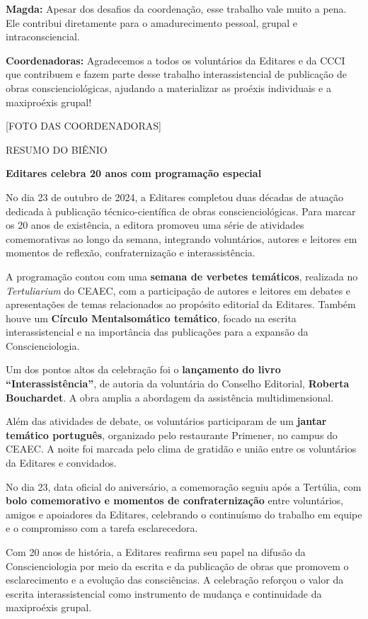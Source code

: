 \textbf{Magda:} Apesar dos desafios da coordenação, esse trabalho vale muito a pena. Ele contribui diretamente para o amadurecimento pessoal, grupal e intraconsciencial.

\textbf{Coordenadoras:} Agradecemos a todos os voluntários da Editares e da CCCI que contribuem e fazem parte desse trabalho interassistencial de publicação de obras conscienciológicas, ajudando a materializar as proéxis individuais e a maxiproéxis grupal!

{[}FOTO DAS COORDENADORAS{]}

RESUMO DO BIÊNIO

\textbf{Editares celebra 20 anos com programação especial}

No dia 23 de outubro de 2024, a Editares completou duas décadas de atuação dedicada à publicação técnico-científica de obras conscienciológicas. Para marcar os 20 anos de existência, a editora promoveu uma série de atividades comemorativas ao longo da semana, integrando voluntários, autores e leitores em momentos de reflexão, confraternização e interassistência.

A programação contou com uma \textbf{semana de verbetes temáticos}, realizada no \emph{Tertuliarium} do CEAEC, com a participação de autores e leitores em debates e apresentações de temas relacionados ao propósito editorial da Editares. Também houve um \textbf{Círculo Mentalsomático temático}, focado na escrita interassistencial e na importância das publicações para a expansão da Conscienciologia.

Um dos pontos altos da celebração foi o \textbf{lançamento do livro ``Interassistência''}, de autoria da voluntária do Conselho Editorial, \textbf{Roberta Bouchardet}. A obra amplia a abordagem da assistência multidimensional.

Além das atividades de debate, os voluntários participaram de um \textbf{jantar temático português}, organizado pelo restaurante Primener, no campus do CEAEC. A noite foi marcada pelo clima de gratidão e união entre os voluntários da Editares e convidados.

No dia 23, data oficial do aniversário, a comemoração seguiu após a Tertúlia, com \textbf{bolo comemorativo e momentos de confraternização} entre voluntários, amigos e apoiadores da Editares, celebrando o continuísmo do trabalho em equipe e o compromisso com a tarefa esclarecedora.

Com 20 anos de história, a Editares reafirma seu papel na difusão da Conscienciologia por meio da escrita e da publicação de obras que promovem o esclarecimento e a evolução das consciências. A celebração reforçou o valor da escrita interassistencial como instrumento de mudança e continuidade da maxiproéxis grupal.

